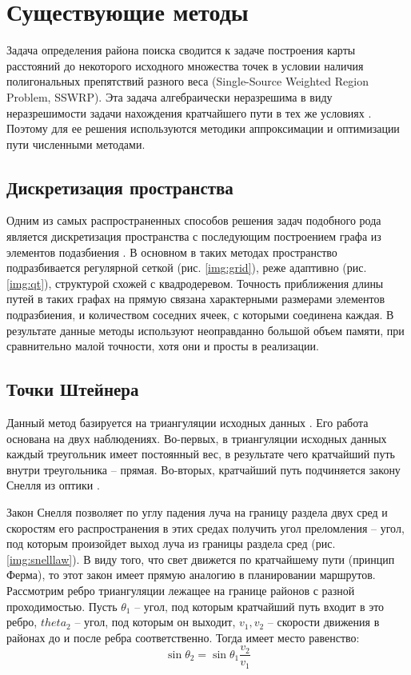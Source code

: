 \chapter{Существующие методы}

Задача определения района поиска сводится к задаче
построения карты расстояний до некоторого исходного множества точек
в условии наличия полигональных препятствий разного веса
(Single-Source Weighted Region Problem, SSWRP). Эта задача алгебраически
неразрешима в виду неразрешимости задачи нахождения кратчайшего пути в
тех же условиях \cite{WRPU}. Поэтому для ее решения используются методики
аппроксимации и оптимизации пути численными методами.

\section{Дискретизация пространства}

Одним из самых распространенных способов решения задач подобного рода является
дискретизация пространства с последующим построением графа из элементов
подазбиения \cite{GRID1, GRID2, GRID3}.
В основном в таких методах пространство подразбивается регулярной сеткой
(рис. \ref{img:grid}), реже адаптивно (рис. \ref{img:qt}), структурой схожей
с квадродеревом. Точность приближения длины путей
в таких графах на прямую связана характерными размерами элементов подразбиения,
и количеством соседних ячеек, с которыми соединена каждая.
В результате данные методы используют неоправданно большой объем памяти, при
сравнительно малой точности, хотя они и просты в реализации.


\FloatBarrier

\section{Точки Штейнера}
Данный метод базируется на триангуляции исходных данных \cite{STAINER1, STAINER2}.
Его работа основана  на двух наблюдениях. Во-первых, в триангуляции исходных
данных каждый треугольник имеет постоянный вес, в результате чего кратчайший
путь внутри треугольника -- прямая. Во-вторых, кратчайший путь подчиняется
закону Снелля из оптики \cite{SNELL}.

Закон Снелля позволяет по углу падения луча на границу раздела двух сред и
скоростям его распространения в этих средах получить угол преломления --
угол, под которым произойдет выход луча из границы раздела сред (рис. \ref{img:snelllaw}).
В виду того, что свет движется по кратчайшему пути (принцип Ферма), то этот закон
имеет прямую аналогию в планировании маршрутов.
Рассмотрим ребро триангуляции лежащее на границе районов с разной проходимостью.
Пусть $\theta_1$ -- угол, под которым кратчайший путь входит в это ребро,
$theta_2$ -- угол, под которым он выходит, $v_1, v_2$ -- скорости движения
в районах до и после ребра соответственно. Тогда имеет место равенство:
\begin{equation}
\sin\theta_2 = \sin\theta_1\frac{v_2}{v_1}
\end{equation}

